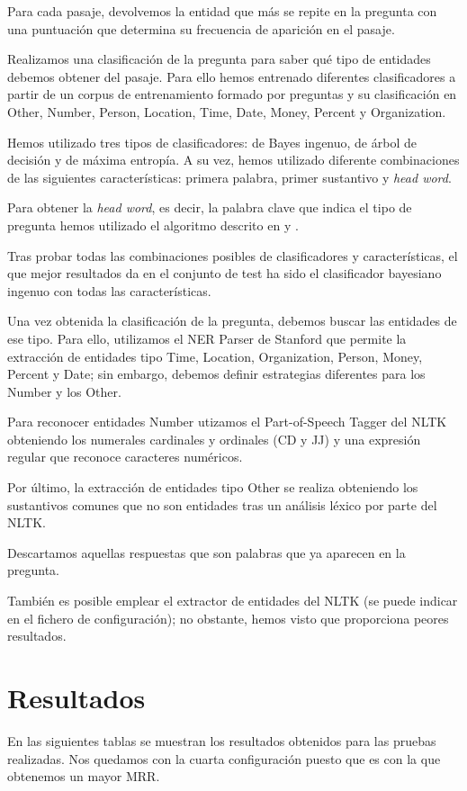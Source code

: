 \documentclass[12pt,a4paper,titlepage]{article}
\newcounter{subsubsubsection}
\begin{document}
Para cada pasaje, devolvemos la entidad que más se repite en la pregunta con una puntuación que determina su frecuencia de aparición en el pasaje.

Realizamos una clasificación de la pregunta para saber qué tipo de entidades debemos obtener del pasaje. Para ello hemos entrenado diferentes clasificadores a partir de un corpus de entrenamiento formado por preguntas y su clasificación en Other, Number, Person, Location, Time, Date, Money, Percent y Organization.

Hemos utilizado tres tipos de clasificadores: de Bayes ingenuo, de árbol de decisión y de máxima entropía. A su vez, hemos utilizado diferente combinaciones de las siguientes características: primera palabra, primer sustantivo y \emph{head word}.

Para obtener la \emph{head word}, es decir, la palabra clave que indica el tipo de pregunta hemos utilizado el algoritmo descrito en \cite{tesis:qc} y \cite{paper:qc}.

Tras probar todas las combinaciones posibles de clasificadores y características, el que mejor resultados da en el conjunto de test ha sido el clasificador bayesiano ingenuo con todas las características.

Una vez obtenida la clasificación de la pregunta, debemos buscar las entidades de ese tipo. Para ello, utilizamos el NER Parser de Stanford que permite la extracción de entidades tipo Time, Location, Organization, Person, Money, Percent y Date; sin embargo, debemos definir estrategias diferentes para los Number y los Other.

Para reconocer entidades Number utizamos el Part-of-Speech Tagger del NLTK obteniendo los numerales cardinales y ordinales (CD y JJ) y una expresión regular que reconoce caracteres numéricos.

Por último, la extracción de entidades tipo Other se realiza obteniendo los sustantivos comunes que no son entidades tras un análisis léxico por parte del NLTK.

Descartamos aquellas respuestas que son palabras que ya aparecen en la pregunta.

También es posible emplear el extractor de entidades del NLTK (se puede indicar en el fichero de configuración); no obstante, hemos visto que proporciona peores resultados.

\clearpage
\section{Resultados}
En las siguientes tablas se muestran los resultados obtenidos para las pruebas realizadas. Nos quedamos con la cuarta configuración puesto que es con la que obtenemos un mayor MRR.
\end{document}
